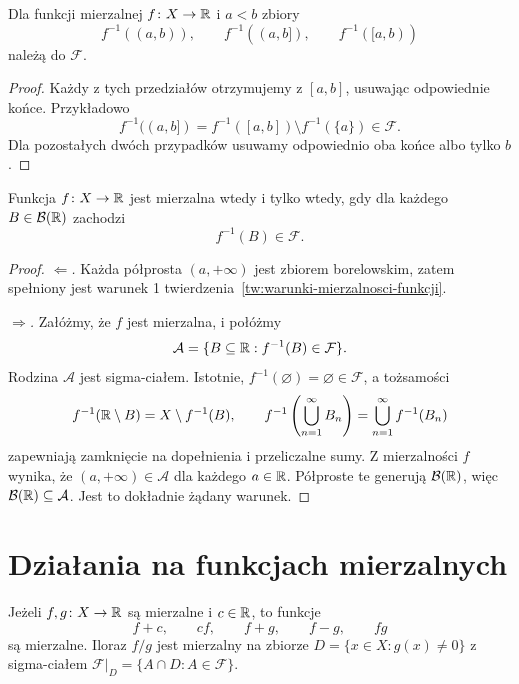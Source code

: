 \begin{fakt}
\label{fakt:przeciwobrazy-przedzialow}
Dla funkcji mierzalnej $f\colon X\to\mathbb{R}$ i $a<b$ zbiory
\[
  f^{-1}((a,b)),\qquad f^{-1}((a,b]),\qquad f^{-1}([a,b))
\]
należą do $\mathcal{F}$.
\end{fakt}

\begin{proof}
Każdy z tych przedziałów otrzymujemy z $[a,b]$, usuwając odpowiednie
końce. Przykładowo
\[
  f^{-1}((a,b])=f^{-1}([a,b])\setminus f^{-1}(\{a\})
  \in\mathcal{F}.
\]
Dla pozostałych dwóch przypadków usuwamy odpowiednio oba końce
albo tylko $b$.
\end{proof}

\begin{twierdzenie}
\label{tw:mierzalnosc-borelowska}
Funkcja $f\colon X\to\mathbb{R}$ jest mierzalna wtedy i tylko wtedy,
gdy dla każdego $B\in\mathcal{B}(\mathbb{R})$ zachodzi
\[
  f^{-1}(B)\in\mathcal{F}.
\]
\end{twierdzenie}

\begin{proof}
\emph{$\Leftarrow$.} Każda półprosta $(a,+\infty)$ jest zbiorem
borelowskim, zatem spełniony jest warunek 1
twierdzenia~\ref{tw:warunki-mierzalnosci-funkcji}.

\emph{$\Rightarrow$.} Załóżmy, że $f$ jest mierzalna, i połóżmy
\[
  \mathcal{A}=\{B\subseteq\mathbb{R}:f^{-1}(B)\in\mathcal{F}\}.
\]
Rodzina $\mathcal{A}$ jest sigma-ciałem. Istotnie,
$f^{-1}(\varnothing)=\varnothing\in\mathcal{F}$, a tożsamości
\[
  f^{-1}(\mathbb{R}\setminus B)=X\setminus f^{-1}(B),\qquad
  f^{-1}\left(\bigcup_{n=1}^{\infty}B_n\right)
  =\bigcup_{n=1}^{\infty}f^{-1}(B_n)
\]
zapewniają zamknięcie na dopełnienia i przeliczalne sumy.
Z mierzalności $f$ wynika, że $(a,+\infty)\in\mathcal{A}$ dla każdego
$a\in\mathbb{R}$. Półproste te generują $\mathcal{B}(\mathbb{R})$, więc
$\mathcal{B}(\mathbb{R})\subseteq\mathcal{A}$. Jest to dokładnie żądany warunek.
\end{proof}

\section{Działania na funkcjach mierzalnych}
\label{sec:dzialania-na-mierzalnych}

\begin{twierdzenie}
\label{tw:dzialania-na-mierzalnych}
Jeżeli $f,g\colon X\to\mathbb{R}$ są mierzalne i $c\in\mathbb{R}$, to funkcje
\[
  f+c,\qquad cf,\qquad f+g,\qquad f-g,\qquad fg
\]
są mierzalne. Iloraz $f/g$ jest mierzalny na zbiorze
$D=\{x\in X:g(x)\neq0\}$ z sigma-ciałem
$\mathcal{F}|_D=\{A\cap D:A\in\mathcal{F}\}$.
\end{twierdzenie}

